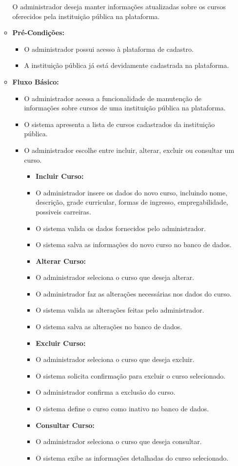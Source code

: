 \begin{itemize}
\begin{itemize}
        O administrador deseja manter informações atualizadas sobre os cursos oferecidos pela instituição pública na plataforma.
        \item \textbf{Pré-Condições:}
        \begin{itemize}
            \item O administrador possui acesso à plataforma de cadastro.
            \item A instituição pública já está devidamente cadastrada na plataforma.
        \end{itemize}
        \item \textbf{Fluxo Básico:}
        \begin{itemize}
            \item O administrador acessa a funcionalidade de manutenção de informações sobre cursos de uma instituição pública na plataforma.
            \item O sistema apresenta a lista de cursos cadastrados da instituição pública.
            \item  O administrador escolhe entre incluir, alterar, excluir ou consultar um curso.
            \begin{itemize}
                \item \textbf{Incluir Curso:}
                \item  O administrador insere os dados do novo curso, incluindo nome, descrição, grade curricular, formas de ingresso, empregabilidade, possiveis carreiras.
                \item O sistema valida os dados fornecidos pelo administrador.
                \item O sistema salva as informações do novo curso no banco de dados.
                \item \textbf{Alterar Curso:}
                \item  O administrador seleciona o curso que deseja alterar.
                \item O administrador faz as alterações necessárias nos dados do curso.
                \item O sistema valida as alterações feitas pelo administrador.
                \item O sistema salva as alterações no banco de dados.
                \item \textbf{Excluir Curso:}
                \item  O administrador seleciona o curso que deseja excluir.
                \item O sistema solicita confirmação para excluir o curso selecionado.
                \item  O administrador confirma a exclusão do curso.
                \item O sistema define o curso como inativo no banco de dados.
                \item \textbf{Consultar Curso:}
                \item  O administrador seleciona o curso que deseja consultar.
                \item O sistema exibe as informações detalhadas do curso selecionado.
                

\end{itemize}
\end{itemize}
\end{itemize}
\end{itemize}
